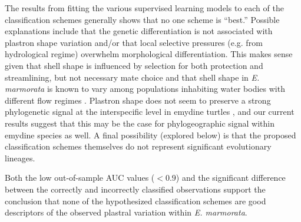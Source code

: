 \documentclass[12pt,letterpaper]{article}
\begin{document}
The results from fitting the various supervised learning models to each of the classification schemes generally shows that no one scheme is ``best.'' Possible explanations include that the genetic differentiation is not associated with plastron shape variation and/or that local selective pressures (e.g. from hydrological regime) overwhelm morphological differentiation. This makes sense given that shell shape is influenced by selection for both protection and streamlining, but not necessary mate choice \citep{Rivera2008,Rivera2011,Stayton2011,Rivera2014,Polly2016} and that shell shape in \textit{E. marmorata} is known to vary among populations inhabiting water bodies with different flow regimes \citep{Holland1992,Lubcke2007,Germano2009}. Plastron shape does not seem to preserve a strong phylogenetic signal at the interspecific level in emydine turtles \citep{Angielczyk2011}, and our current results suggest that this may be the case for phylogeographic signal within emydine species as well. A final possibility (explored below) is that the proposed classification schemes themselves do not represent significant evolutionary lineages.

Both the low out-of-sample AUC values (\(< 0.9\)) and the significant difference between the correctly and incorrectly classified observations support the conclusion that none of the hypothesized classification schemes are good descriptors of the observed plastral variation within \textit{E. marmorata}.
\end{document}
